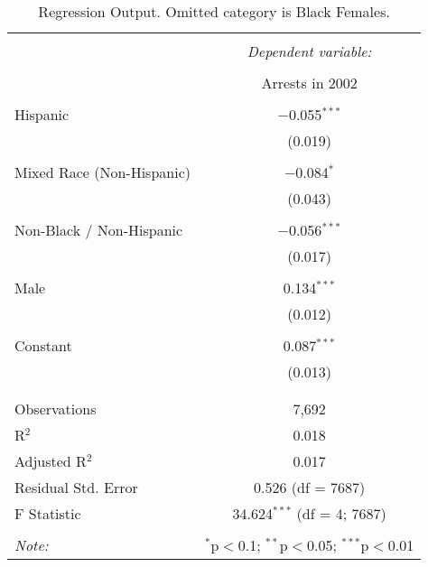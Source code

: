 
\begin{table}[!htbp] \centering 
  \caption{Regression Output. Omitted category is Black Females.} 
  \label{tab:regression} 
\begin{tabular}{@{\extracolsep{5pt}}lc} 
\\[-1.8ex]\hline 
\hline \\[-1.8ex] 
 & \multicolumn{1}{c}{\textit{Dependent variable:}} \\ 
\cline{2-2} 
\\[-1.8ex] & Arrests in 2002 \\ 
\hline \\[-1.8ex] 
 Hispanic & $-$0.055$^{***}$ \\ 
  & (0.019) \\ 
  & \\ 
 Mixed Race (Non-Hispanic) & $-$0.084$^{*}$ \\ 
  & (0.043) \\ 
  & \\ 
 Non-Black / Non-Hispanic & $-$0.056$^{***}$ \\ 
  & (0.017) \\ 
  & \\ 
 Male & 0.134$^{***}$ \\ 
  & (0.012) \\ 
  & \\ 
 Constant & 0.087$^{***}$ \\ 
  & (0.013) \\ 
  & \\ 
\hline \\[-1.8ex] 
Observations & 7,692 \\ 
R$^{2}$ & 0.018 \\ 
Adjusted R$^{2}$ & 0.017 \\ 
Residual Std. Error & 0.526 (df = 7687) \\ 
F Statistic & 34.624$^{***}$ (df = 4; 7687) \\ 
\hline 
\hline \\[-1.8ex] 
\textit{Note:}  & \multicolumn{1}{r}{$^{*}$p$<$0.1; $^{**}$p$<$0.05; $^{***}$p$<$0.01} \\ 
\end{tabular} 
\end{table} 
